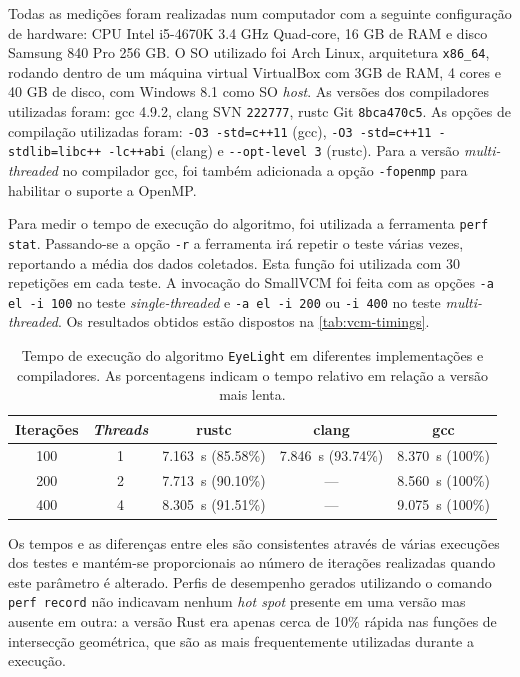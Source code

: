\documentclass[tg]{mdtufsm}
\begin{document}
Todas as medições foram realizadas num computador com a seguinte configuração de hardware: CPU Intel i5-4670K 3.4 GHz Quad-core, 16 GB de RAM e disco Samsung 840 Pro 256 GB. O SO utilizado foi Arch Linux, arquitetura \texttt{x86\_64}, rodando dentro de um máquina virtual VirtualBox com 3GB de RAM, 4 cores e 40 GB de disco, com Windows 8.1 como SO \emph{host}. As versões dos compiladores utilizadas foram: gcc 4.9.2, clang SVN \texttt{222777}, rustc Git \texttt{8bca470c5}. As opções de compilação utilizadas foram: \texttt{-O3 -std=c++11} (gcc), \texttt{-O3 -std=c++11 -stdlib=libc++ -lc++abi} (clang) e \texttt{-{}-opt-level 3} (rustc). Para a versão \emph{multi-threaded} no compilador gcc, foi também adicionada a opção \texttt{-fopenmp} para habilitar o suporte a OpenMP.

Para medir o tempo de execução do algoritmo, foi utilizada a ferramenta \texttt{perf stat}. Passando-se a opção \texttt{-r} a ferramenta irá repetir o teste várias vezes, reportando a média dos dados coletados. Esta função foi utilizada com 30 repetições em cada teste. A invocação do SmallVCM foi feita com as opções \texttt{-a el -i 100} no teste \emph{single-threaded} e \texttt{-a el -i 200} ou \texttt{-i 400} no teste \emph{multi-threaded}. Os resultados obtidos estão dispostos na \autoref{tab:vcm-timings}.

\begin{table}
	\centering
	\begin{tabular}{|c|c|c|c|c|} \hline
	Iterações & \emph{Threads} & rustc & clang & gcc \\ \hline
	100 & 1 & \SI{7.163}{\s} (85.58\%) & \SI{7.846}{\s} (93.74\%) & \SI{8.370}{\s} (100\%) \\
	200 & 2 & \SI{7.713}{\s} (90.10\%) & ---                      & \SI{8.560}{\s} (100\%) \\
	400 & 4 & \SI{8.305}{\s} (91.51\%) & ---                      & \SI{9.075}{\s} (100\%) \\ \hline
	\end{tabular}
	\caption[Tempo de execução do algoritmo \texttt{EyeLight} em diferentes implementações e compiladores.]{
		Tempo de execução do algoritmo \texttt{EyeLight} em diferentes implementações e compiladores. As porcentagens indicam o tempo relativo em relação a versão mais lenta.
	}
	\label{tab:vcm-timings}
\end{table}

Os tempos e as diferenças entre eles são consistentes através de várias execuções dos testes e mantém-se proporcionais ao número de iterações realizadas quando este parâmetro é alterado. Perfis de desempenho gerados utilizando o comando \texttt{perf record} não indicavam nenhum \emph{hot spot} presente em uma versão mas ausente em outra: a versão Rust era apenas cerca de 10\% rápida nas funções de intersecção geométrica, que são as mais frequentemente utilizadas durante a execução.
\end{document}
